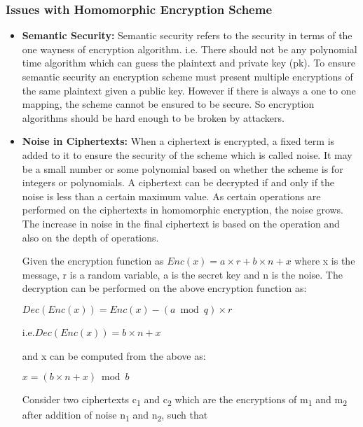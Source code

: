 \subsubsection{Issues with Homomorphic Encryption Scheme} \label{limitations}
\begin{itemize}
\item
\textbf{Semantic Security:} Semantic security refers to the security in terms of the one wayness of encryption algorithm. i.e. There should not be any polynomial time algorithm which can guess the plaintext and private key (pk). To ensure semantic security an encryption scheme must present multiple encryptions of the same plaintext given a public key. However if there is always a one to one mapping, the scheme cannot be ensured to be secure. So encryption algorithms should be hard enough to be broken by attackers. 
\item 
\textbf{Noise in Ciphertexts:} When a ciphertext is encrypted, a fixed term is added to it to ensure the security of the scheme which is called noise. It may be a small number or some polynomial based on whether the scheme is for integers or polynomials. A ciphertext can be decrypted if and only if the noise is less than a certain maximum value. As certain operations are performed on the ciphertexts in homomorphic encryption, the noise grows. The increase in noise in the final ciphertext is based on the operation and also on the depth of operations.

 \noindent Given the encryption function as $Enc(x)=a\times r+b\times n+x$ where x is the message, r is a random variable, a is the secret key and n is the noise. The decryption can be performed on the above encryption function as: 

 \noindent\hspace{3cm} $Dec(Enc(x))=Enc(x)-(a\bmod q)\times r$
 
 \noindent i.e.\hspace{2.7cm}$Dec(Enc(x))= b\times n+x$
 
 \noindent and x can be computed from the above as:
 
 \noindent\hspace{3cm} $x=(b\times n+x)\bmod b$

\vspace{0.25cm}
 \noindent Consider two ciphertexts c\textsubscript{1} and c\textsubscript{2} which are the encryptions of m\textsubscript{1} and m\textsubscript{2} after addition of noise n\textsubscript{1} and n\textsubscript{2}, such that
 

\end{itemize}
